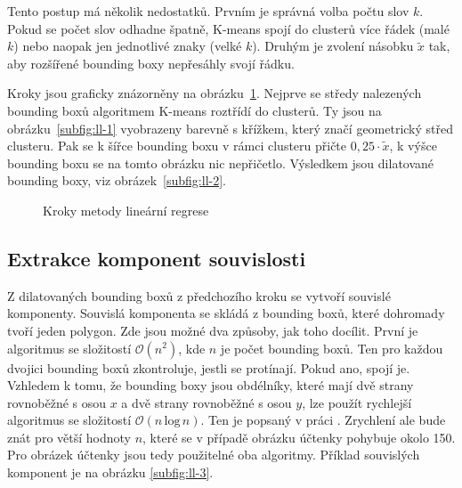 \documentclass[thesis=B,czech]{FITthesis}[2019/12/23]
\begin{document}
Tento postup má několik nedostatků. Prvním je správná volba počtu slov $k$. Pokud se počet slov odhadne špatně, K-means spojí do clusterů více řádek (malé $k$) nebo naopak jen jednotlivé znaky (velké $k$). Druhým je zvolení násobku $\tilde{x}$ tak, aby rozšířené bounding boxy nepřesáhly svojí řádku.

Kroky jsou graficky znázorněny na obrázku~\ref{fig:ll-steps}. Nejprve se  středy nalezených bounding boxů algoritmem K-means roztřídí do clusterů. Ty jsou na obrázku~\ref{subfig:ll-1} vyobrazeny barevně s křížkem, který značí geometrický střed clusteru. Pak se k šířce bounding boxu v rámci clusteru přičte $0,25 \cdot \tilde{x}$, k výšce bounding boxu se na tomto obrázku nic nepřičetlo. Výsledkem jsou dilatované bounding boxy, viz obrázek~\ref{subfig:ll-2}.

\begin{figure}[p]%
	\centering
	\hspace{1pt}
	\hspace{1pt}
	\hspace{1pt}
	\hspace{1pt}
	\caption{Kroky metody lineární regrese}
	\label{fig:ll-steps}%
\end{figure}

\subsection{Extrakce komponent souvislosti}
Z dilatovaných bounding boxů z předchozího kroku se vytvoří souvislé komponenty. Souvislá komponenta se skládá z bounding boxů, které dohromady tvoří jeden polygon.  Zde jsou možné dva způsoby, jak toho docílit. První je algoritmus se složitostí $\mathcal{O}(n^2)$, kde $n$ je počet bounding boxů. Ten pro každou dvojici bounding boxů zkontroluje, jestli se protínají. Pokud ano, spojí je. Vzhledem k tomu, že bounding boxy jsou obdélníky, které mají dvě strany rovnoběžné s osou $x$ a dvě strany rovnoběžné s osou $y$, lze použít rychlejší algoritmus se složitostí $\mathcal{O}(n\,\mathrm{log}\,n)$. Ten je popsaný v práci  \cite{Imai1983a}. Zrychlení ale bude znát pro větší hodnoty $n$, které se v případě obrázku účtenky pohybuje okolo 150. Pro obrázek účtenky jsou tedy použitelné oba algoritmy. Příklad souvislých komponent je na obrázku \ref{subfig:ll-3}.
\end{document}
